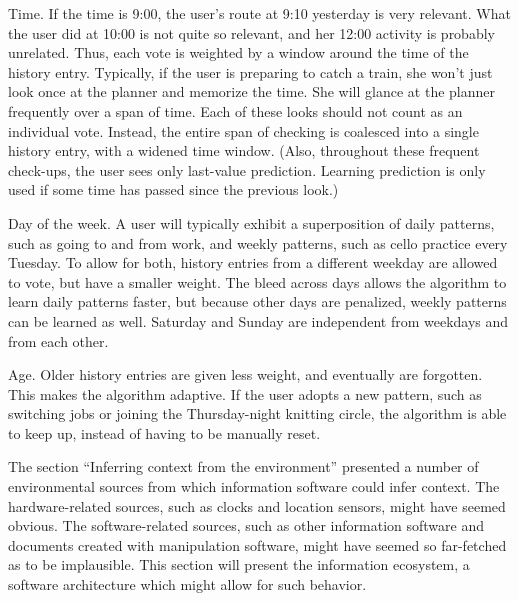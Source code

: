 {Time. If the time is 9:00, the user’s route at 9:10 yesterday is very relevant. What the user did at 10:00 is not quite so relevant, and her 12:00 activity is probably unrelated. Thus, each vote is weighted by a window around the time of the history entry. Typically, if the user is preparing to catch a train, she won’t just look once at the planner and memorize the time. She will glance at the planner frequently over a span of time. Each of these looks should not count as an individual vote. Instead, the entire span of checking is coalesced into a single history entry, with a widened time window. (Also, throughout these frequent check-ups, the user sees only last-value prediction. Learning prediction is only used if some time has passed since the previous look.)

Day of the week. A user will typically exhibit a superposition of daily patterns, such as going to and from work, and weekly patterns, such as cello practice every Tuesday. To allow for both, history entries from a different weekday are allowed to vote, but have a smaller weight. The bleed across days allows the algorithm to learn daily patterns faster, but because other days are penalized, weekly patterns can be learned as well. Saturday and Sunday are independent from weekdays and from each other.

Age. Older history entries are given less weight, and eventually are forgotten. This makes the algorithm adaptive. If the user adopts a new pattern, such as switching jobs or joining the Thursday-night knitting circle, the algorithm is able to keep up, instead of having to be manually reset.

The section “Inferring context from the environment” presented a number of environmental sources from which information software could infer context. The hardware-related sources, such as clocks and location sensors, might have seemed obvious. The software-related sources, such as other information software and documents created with manipulation software, might have seemed so far-fetched as to be implausible. This section will present the information ecosystem, a software architecture which might allow for such behavior.

}